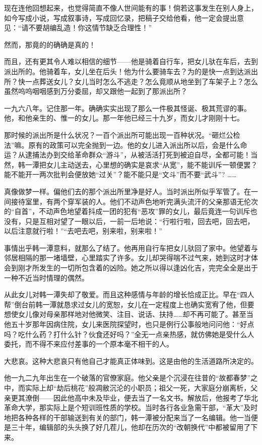\par 现在连他回想起来，也觉得简直不像人世间能有的事！倘若这事发生在别人身上，如今写成小说，写成叙事诗，写成回忆录，把稿子交给他看，他一定会提出意见：“请不要胡编乱造！你这情节缺乏合理性！”
\par 然而，那竟的的确确是真的！
\par 而且，还有更其令人难以相信的细节——他是骑着自行车，把女儿驮在车后，去到派出所的。他骑着车，女儿坐在后头！他为什么要骑车去？为的是快一点到达派出所？快一点葬送女儿？女儿当时怎么不逃走？怎么竟顺从地坐到了车架子上？怎么虽然呜呜咽咽感到万分委屈，却又跟他一起到了那派出所？
\par 一九六八年。记住那一年。确确实实出现了那么一件极其怪诞、极其荒谬的事。他，和他亲生的、惟一的女儿。那一年他已经三十九岁，而女儿才刚刚十七。
\par 那时候的派出所是什么状况？一百个派出所可能出现一百种状况。“砸烂公检法”嘛。原有的政策可以完全抛到一边。他的女儿进入派出所以后，会是什么命运？从逮捕法办到交给革命群众“游斗”，从被活活打死到被迫自尽，全都可能！当然，韩一潭把女儿主动送去，心里想的确实是哀求“从宽”，能不能训斥一顿便罢？能不能开一两次批判会便放她“过关”？能不能只是“文斗”而不要“武斗”? ……
\par 真像做梦一样。偏他们去的那个派出所里净是好人。当时派出所似乎军管了。在一间接待室里，有两个穿军装的人。他们不动声色地听完满头流汗的父亲那语无伦次的“自首”，不动声色地望着抖成一团的犯有“恶攻”罪的女儿，最后竟连一句训斥也没有，只是互相对望了一眼以后，一前一后地说：“行啦行啦，回去吧，回去吧，以后注意就行啦！”“去吧去吧，别来啦，别来啦！”
\par 事情出乎韩一潭意料，就那么了结了。他再用自行车把女儿驮回了家中。他望着与邻居相隔的那一堵墙壁，心里踏实了许多。女儿却哭得喘不过气来，她到这时才体会到刚才所发生的一切所包含着的凶险。她之所以得以逢凶化吉，完完全全是出于一种不近当时情理的偶然。
\par 从此女儿对韩一潭失却了敬爱。而且这种感情与年龄的增长恰成正比。早在“四人帮”倒台前韩一潭就恳求过女儿的宽恕，女儿在一定程度上也确实宽宥了他，但要想使女儿像对母亲那样地对他微笑、注目、说话、扶持……却不再可能了。甚至当他五十岁那年因病住院，女儿来医院探望时，也只是例行公事般地问问他：“好点吗？吃什么药？打什么针？伙食还好吗？”全无一点亲热感，就仿佛她是受什么人委托，而不得不来应付差事的一个原本毫不相干的人。
\par 大悲哀。这种大悲哀只有他自己才能真正体味到。这是由他的生活道路所决定的。
\par 他一九二九年出生在一个破落的官僚家庭。他父亲是个沉浸在往昔的“故都春梦”之中，而实际上却“劫后桃花”般凋敝沉沦的小职员；祖父一死，大家庭分崩离析，父亲更其潦倒——因此他高中未及毕业，便去当了一名文书。解放后，他报考了华北革命大学，那实际上是个短训班性质的学校。当时各行各业急需干部，“革大”及时地把各种各样的干部输送到有关的部门，韩一潭被分配来当了一名编辑。他一当便是三十年，编辑部的头头换了好几茬儿，他却在历次的“改朝换代”中都被留用了下来。
